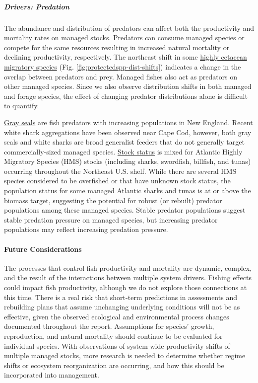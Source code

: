 \documentclass[
  10pt,
]{article}
\begin{document}
\subparagraph{Drivers: Predation}\label{drivers-predation}

The abundance and distribution of predators can affect both the productivity and mortality rates on managed stocks. Predators can consume managed species or compete for the same resources resulting in increased natural mortality or declining productivity, respectively. The northeast shift in some \href{https://noaa-edab.github.io/catalog/cetacean_dist.html}{highly cetacean migratory species} (Fig. \ref{fig:protectedspp-dist-shifts}) indicates a change in the overlap between predators and prey. Managed fishes also act as predators on other managed species. Since we also observe distribution shifts in both managed and forage species, the effect of changing predator distributions alone is difficult to quantify.

\href{https://noaa-edab.github.io/catalog/grayseal.html}{Gray seals} are fish predators with increasing populations in New England. Recent white shark aggregations have been observed near Cape Cod, however, both gray seals and white sharks are broad generalist feeders that do not generally target commercially-sized managed species. \href{https://noaa-edab.github.io/catalog/hms_stock_status.html}{Stock status} is mixed for Atlantic Highly Migratory Species (HMS) stocks (including sharks, swordfish, billfish, and tunas) occurring throughout the Northeast U.S. shelf. While there are several HMS species considered to be overfished or that have unknown stock status, the population status for some managed Atlantic sharks and tunas is at or above the biomass target, suggesting the potential for robust (or rebuilt) predator populations among these managed species. Stable predator populations suggest stable predation pressure on managed species, but increasing predator populations may reflect increasing predation pressure.

\paragraph{Future Considerations}\label{future-considerations-2}

The processes that control fish productivity and mortality are dynamic, complex, and the result of the interactions between multiple system drivers. Fishing effects could impact fish productivity, although we do not explore those connections at this time. There is a real risk that short-term predictions in assessments and rebuilding plans that assume unchanging underlying conditions will not be as effective, given the observed ecological and environmental process changes documented throughout the report. Assumptions for species' growth, reproduction, and natural mortality should continue to be evaluated for individual species. With observations of system-wide productivity shifts of multiple managed stocks, more research is needed to determine whether regime shifts or ecosystem reorganization are occurring, and how this should be incorporated into management.
\end{document}
